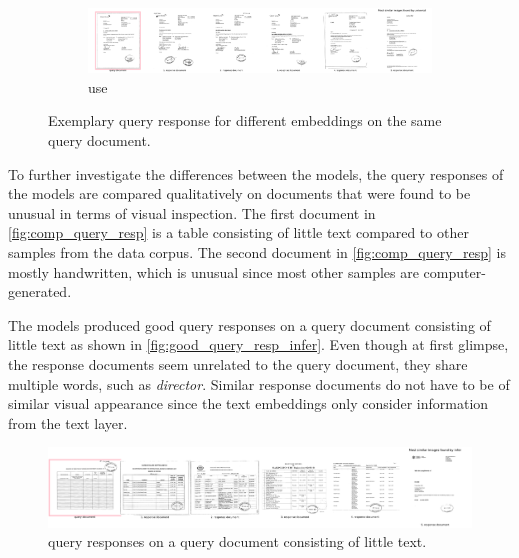 \begin{figure}[h!]
    \begin{subfigure}{\textwidth}
        \centering
        \includegraphics[width=1\textwidth]{images/query_results/4b4d0a9ee0c7283e5bfd69c402c73b2140bf90351c8f44d6809afe23c6dfaa50/Most_similar_images_found_by_universal.pdf}
        \caption{\ac{use}}
        \label{fig:query_resp_use}
    \end{subfigure}
\caption[Exemplary query response]{Exemplary query response for different embeddings on the same query document.}
\label{fig:query_resp}
\end{figure}

To further investigate the differences between the models, 
the query responses of the models are compared qualitatively on documents that were found to be unusual in terms of visual inspection.
The first document in \autoref{fig:comp_query_resp} is a table consisting of little text compared to other samples from the data corpus.
The second document in \autoref{fig:comp_query_resp} is mostly handwritten, which is unusual since most other samples are computer-generated.

The models produced good query responses on a query document consisting of little text as shown in \autoref{fig:good_query_resp_infer}.
Even though at first glimpse, the response documents seem unrelated to the query document, they share multiple words, such as \textit{director}.
Similar response documents do not have to be of similar visual appearance since the text embeddings only consider information from the text layer.

\begin{figure}[!htb] %
    \centering
    \includegraphics[width=1\textwidth]{images/query_results/42b7e56855c88c22ed01f381167e6f0887815e1ef7ea6b149be06ee1f8557b9e/Most_similar_images_found_by_infer.pdf}
    \caption[\infersent{} query responses]{\infersent{} query responses on a query document consisting of little text.
    }
    \label{fig:good_query_resp_infer}
\end{figure}

